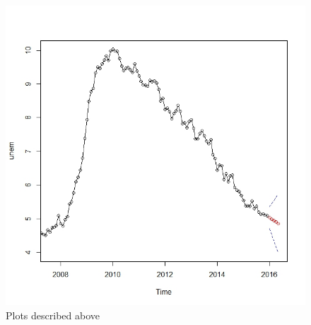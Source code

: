 \documentclass[twoside,twocolumn]{article}
\begin{document}
 \begin{figure}[H]
    	\centering
     	\caption{Plots described above}
     	\includegraphics[width=.9\linewidth]{images/fore1}
 \end{figure}
 
\end{document}
